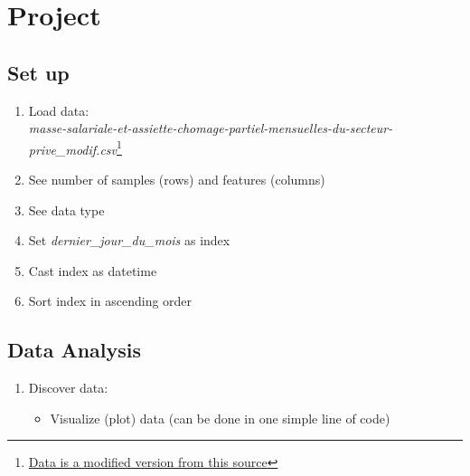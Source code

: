 
\setcounter{section}{0}


\section{Project}


\subsection{Set up}

\begin{enumerate}
    \item Load data:\\
    \textit{masse-salariale-et-assiette-chomage-partiel-mensuelles-du-secteur-prive\_modif.csv}\footnote{\href{https://www.data.gouv.fr/fr/datasets/masse-salariale-et-assiette-chomage-partiel-mensuelles-du-secteur-prive/}{Data is a modified version from this source}}
    \item See number of samples (rows) and features (columns)
    \item See data type
    \item Set \textit{dernier\_jour\_du\_mois} as index
    \item Cast index as datetime
    \item Sort index in ascending order
\end{enumerate}


\subsection{Data Analysis}

\begin{enumerate}
    \item Discover data:
    \begin{itemize}
        \item Visualize (plot) data (can be done in one simple line of code)
    \end{itemize}
\end{enumerate}

